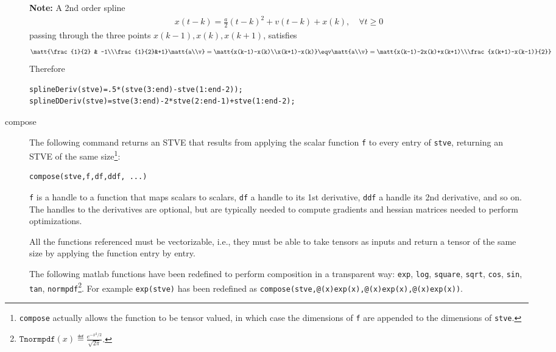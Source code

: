 \documentclass[11pt]{article}
\theoremstyle{remark}
\begin{document}
\begin{description}
  \textbf{Note:} A 2nd order spline
  \begin{align*}
    x(t-k) = \frac{a}{2} (t-k)^2+ v (t-k) + x(k), \quad\forall t\ge 0
  \end{align*}
  passing through the three points $x(k-1),x(k),x(k+1)$, satisfies
  \begin{align*}
    \matt{\frac{1}{2} & -1\\\frac{1}{2}&+1}\matt{a\\v}=\matt{x(k-1)-x(k)\\x(k+1)-x(k)}
    \eqv
    \matt{a\\v}
    =\matt{x(k-1)-2x(k)+x(k+1)\\\frac{x(k+1)-x(k-1)}{2}}
  \end{align*}
  Therefore
\begin{lstlisting}
splineDeriv(stve)=.5*(stve(3:end)-stve(1:end-2));
splineDDeriv(stve)=stve(3:end)-2*stve(2:end-1)+stve(1:end-2);
\end{lstlisting}

\item[compose] The following command returns an STVE that results from
  applying the scalar function \lstinline{f} to every entry of
  \lstinline{stve}, returning an STVE of the same
  size\footnote{\lstinline{compose} actually allows the function to be
    tensor valued, in which case the dimensions of \lstinline{f} are
    appended to the dimensions of \lstinline{stve}.}:
\begin{lstlisting}
compose(stve,f,df,ddf, ...)
\end{lstlisting}
  \lstinline{f} is a \matlab{} handle to a function that maps
  scalars to scalars, \lstinline{df} a handle to its 1st derivative,
  \lstinline{ddf} a handle its 2nd derivative, and so on. The handles
  to the derivatives are optional, but are typically needed to compute
  gradients and hessian matrices needed to perform optimizations.

  All the functions referenced must be vectorizable, i.e., they must
  be able to take tensors as inputs and return a tensor of the same
  size by applying the function entry by entry.

  The following matlab functions have been redefined to perform
  composition in a transparent way: \lstinline{exp}, \lstinline{log},
  \lstinline{square}, \lstinline{sqrt}, \lstinline{cos},
  \lstinline{sin}, \lstinline{tan},
  \lstinline{normpdf}\footnote{$\texttt{Tnormpdf}(x)\eqdef
    \frac{e^{-x^2/2}}{\sqrt{2\pi}}$.}. For example
  \lstinline{exp(stve)} has been redefined as
  \lstinline{compose(stve,@(x)exp(x),@(x)exp(x),@(x)exp(x))}.
  

\end{description}
\end{document}

